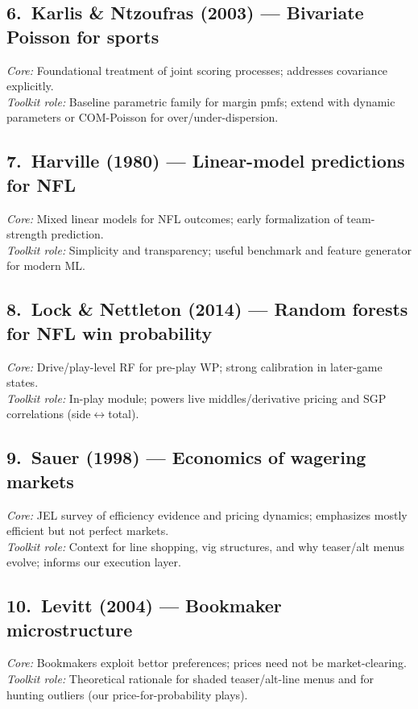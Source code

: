 \documentclass[11pt]{amsart}
\begin{document}
\subsection*{6.\ Karlis \& Ntzoufras (2003) \cite{KarlisNtzoufras2003} --- Bivariate Poisson for sports}
\emph{Core:} Foundational treatment of joint scoring processes; addresses covariance explicitly. \\
\emph{Toolkit role:} Baseline parametric family for margin pmfs; extend with dynamic parameters or COM-Poisson for over/under-dispersion.

\subsection*{7.\ Harville (1980) \cite{Harville1980} --- Linear-model predictions for NFL}
\emph{Core:} Mixed linear models for NFL outcomes; early formalization of team-strength prediction. \\
\emph{Toolkit role:} Simplicity and transparency; useful benchmark and feature generator for modern ML.

\subsection*{8.\ Lock \& Nettleton (2014) \cite{LockNettleton2014} --- Random forests for NFL win probability}
\emph{Core:} Drive/play-level RF for pre-play WP; strong calibration in later-game states. \\
\emph{Toolkit role:} In-play module; powers live middles/derivative pricing and SGP correlations (side$\leftrightarrow$total).

\subsection*{9.\ Sauer (1998) \cite{Sauer1998} --- Economics of wagering markets}
\emph{Core:} JEL survey of efficiency evidence and pricing dynamics; emphasizes mostly efficient but not perfect markets. \\
\emph{Toolkit role:} Context for line shopping, vig structures, and why teaser/alt menus evolve; informs our execution layer.

\subsection*{10.\ Levitt (2004) \cite{Levitt2004} --- Bookmaker microstructure}
\emph{Core:} Bookmakers exploit bettor preferences; prices need not be market-clearing. \\
\emph{Toolkit role:} Theoretical rationale for shaded teaser/alt-line menus and for hunting outliers (our price-for-probability plays).
\end{document}
